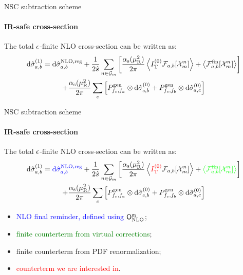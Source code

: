 
\begin{frame}{NSC subtraction scheme}
  \framesubtitle{IR-safe cross-section}

  The total $ \epsilon $-finite NLO cross-section can be written as:
  \begin{multline*}
    \mathrm{d}\hat{\sigma}_{a,b}^{(1)} = \mathrm{d}\hat{\sigma}_{a,b}^\text{NLO,reg} + \frac{1}{2\hat{s}} \sum_{n \in \mathcal{G}_m} \left[ \frac{\alpha_\text{s}(\mu_\text{R}^2)}{2\pi} \left\langle I_\text{T}^{(0)} \mathcal{F}_{a,b}[\mathcal{X}^{n}_{m}] \right\rangle + \left\langle \mathcal{F}_{a,b}^\text{fin}[\mathcal{X}^{n}_{m}] \right\rangle \right] \\
    + \frac{\alpha_\text{s}(\mu_\text{R}^2)}{2\pi} \sum_c \left[ P^\text{gen}_{f_c , f_a} \otimes \mathrm{d}\hat{\sigma}^{(0)}_{c,b} + P^\text{gen}_{f_c , f_b} \otimes \mathrm{d}\hat{\sigma}^{(0)}_{a,c} \right]
  \end{multline*}

  \vspace{6.41em}

\end{frame}


\begin{frame}[noframenumbering]{NSC subtraction scheme}
  \framesubtitle{IR-safe cross-section}

  The total $ \epsilon $-finite NLO cross-section can be written as:
  \begin{multline*}
    \mathrm{d}\hat{\sigma}_{a,b}^{(1)} = \textcolor{blue}{\mathrm{d}\hat{\sigma}_{a,b}^\text{NLO,reg}} + \frac{1}{2\hat{s}} \sum_{n \in \mathcal{G}_m} \left[ \frac{\alpha_\text{s}(\mu_\text{R}^2)}{2\pi} \left\langle \textcolor{red}{I_\text{T}^{(0)}} \mathcal{F}_{a,b}[\mathcal{X}^{n}_{m}] \right\rangle + \textcolor{green}{\left\langle \mathcal{F}_{a,b}^\text{fin}[\mathcal{X}^{n}_{m}] \right\rangle} \right] \\
    + \frac{\alpha_\text{s}(\mu_\text{R}^2)}{2\pi} \sum_c \left[ P^\text{gen}_{f_c , f_a} \otimes \mathrm{d}\hat{\sigma}^{(0)}_{c,b} + P^\text{gen}_{f_c , f_b} \otimes \mathrm{d}\hat{\sigma}^{(0)}_{a,c} \right]
  \end{multline*}
  \begin{itemize}[<+->]
    \item \textcolor{blue}{NLO final reminder, defined using $ \mathsf{O}_\text{NLO}^{\mathfrak{m}} $};
    \item \textcolor{green}{finite counterterm from virtual corrections};
    \item finite counterterm from PDF renormalization;
    \item \textcolor{red}{counterterm we are interested in}.
  \end{itemize}

\end{frame}

